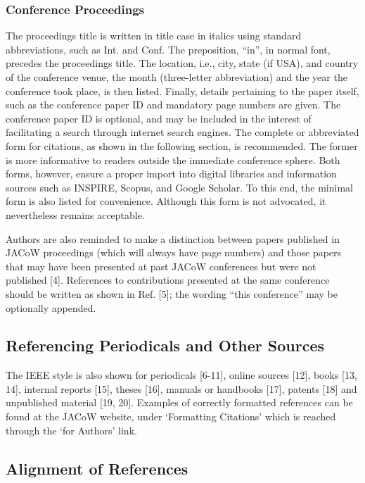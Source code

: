 \documentclass[a4paper,
              ]{jacow}
\begin{document}
\subsubsection{Conference Proceedings} The proceedings title is written
in title case in italics using standard abbreviations,
such as Int. and Conf. The preposition, “in”, in normal
font, precedes the proceedings title. The location,
i.e., city, state (if USA), and country of the conference
venue, the month (three-letter abbreviation) and the year
the conference took place, is then listed. Finally, details
pertaining to the paper itself, such as the conference paper
ID and mandatory page numbers are given. The conference
paper ID is optional, and may be included in the
interest of facilitating a search through internet search
engines. The complete or abbreviated form for citations,
as shown in the following section, is recommended. The
former is more informative to readers outside the immediate
conference sphere. Both forms, however, ensure a
proper import into digital libraries and information
sources such as INSPIRE, Scopus, and Google Scholar.
To this end, the minimal form is also listed for convenience.
Although this form is not advocated, it nevertheless
remains acceptable.

Authors are also reminded to make a distinction between
papers published in JACoW proceedings (which
will always have page numbers) and those papers that
may have been presented at past JACoW conferences but
were not published [4]. References to contributions presented
at the same conference should be written as shown
in Ref. [5]; the wording “this conference” may be optionally
appended.

\subsection{Referencing Periodicals and Other Sources}

The IEEE style is also shown for periodicals [6-11],
online sources [12], books [13, 14], internal reports [15],
theses [16], manuals or handbooks [17], patents [18] and
unpublished material [19, 20]. Examples of correctly
formatted references can be found at the JACoW website,
under ‘Formatting Citations’ which is reached through the
‘for Authors’ link.

\subsection{Alignment of References}
\end{document}
